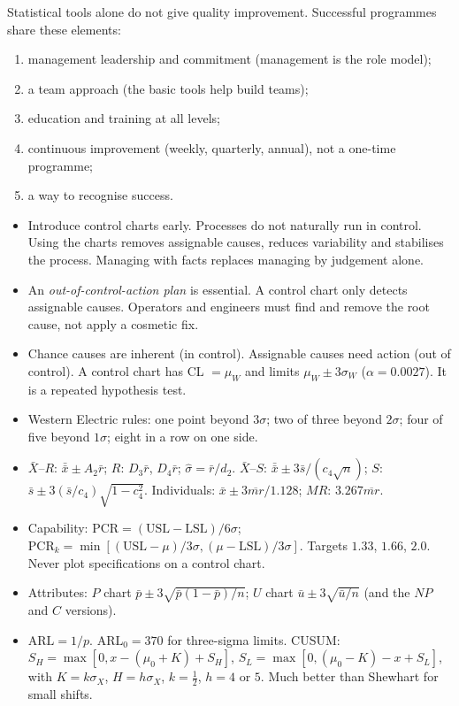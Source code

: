 Statistical tools alone do not give quality improvement. Successful programmes share these elements:
\begin{enumerate}[label=(\arabic*)]
  \item management leadership and commitment (management is the role model);
  \item a team approach (the basic tools help build teams);
  \item education and training at all levels;
  \item continuous improvement (weekly, quarterly, annual), not a one-time programme;
  \item a way to recognise success.
\end{enumerate}
\begin{itemize}
  \item Introduce control charts early. Processes do not naturally run in control. Using the charts removes assignable causes, reduces variability and stabilises the process. Managing with facts replaces managing by judgement alone.
  \item An \emph{out-of-control-action plan} is essential. A control chart only detects assignable causes. Operators and engineers must find and remove the root cause, not apply a cosmetic fix.
\end{itemize}

\begin{summarybox}
\begin{itemize}
  \item Chance causes are inherent (in control). Assignable causes need action (out of control). A control chart has CL $=\mu_W$ and limits $\mu_W\pm3\sigma_W$ ($\alpha=0.0027$). It is a repeated hypothesis test.
  \item Western Electric rules: one point beyond $3\sigma$; two of three beyond $2\sigma$; four of five beyond $1\sigma$; eight in a row on one side.
  \item $\bar{X}$--$R$: $\bar{\bar{x}}\pm A_2\bar{r}$; $R$: $D_3\bar{r}$, $D_4\bar{r}$; $\hat\sigma=\bar{r}/d_2$. $\bar{X}$--$S$: $\bar{\bar{x}}\pm3\bar{s}/(c_4\sqrt n)$; $S$: $\bar{s}\pm3(\bar{s}/c_4)\sqrt{1-c_4^2}$. Individuals: $\bar{x}\pm3\overline{mr}/1.128$; $MR$: $3.267\overline{mr}$.
  \item Capability: $\mathrm{PCR}=(\mathrm{USL}-\mathrm{LSL})/6\sigma$; $\mathrm{PCR}_k=\min[(\mathrm{USL}-\mu)/3\sigma,(\mu-\mathrm{LSL})/3\sigma]$. Targets $1.33$, $1.66$, $2.0$. Never plot specifications on a control chart.
  \item Attributes: $P$ chart $\bar{p}\pm3\sqrt{\bar{p}(1-\bar{p})/n}$; $U$ chart $\bar{u}\pm3\sqrt{\bar{u}/n}$ (and the $NP$ and $C$ versions).
  \item $\mathrm{ARL}=1/p$. $\mathrm{ARL}_0=370$ for three-sigma limits. CUSUM: $S_H=\max[0,x-(\mu_0+K)+S_H]$, $S_L=\max[0,(\mu_0-K)-x+S_L]$, with $K=k\sigma_X$, $H=h\sigma_X$, $k=\frac12$, $h=4$ or $5$. Much better than Shewhart for small shifts.
\end{itemize}
\end{summarybox}

